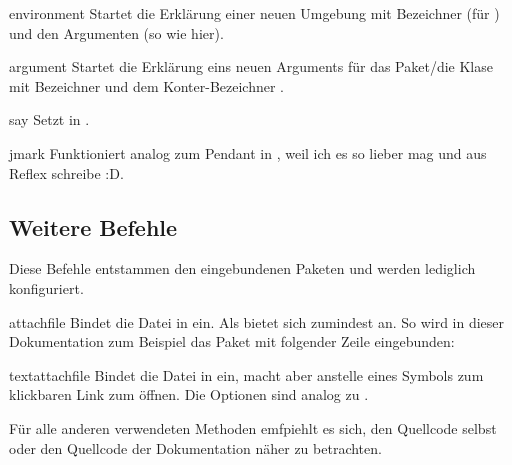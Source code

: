 \documentclass{sopra-base}
\begin{document}
\begin{environment}{environment}{}
    Startet die Erklärung einer neuen Umgebung mit Bezeichner  (für ) und den Argumenten  (so wie hier).
\end{environment}

\begin{environment}{argument}{}
    Startet die Erklärung eins neuen Arguments für das Paket/die Klase mit Bezeichner  und dem Konter-Bezeichner .
\end{environment}

\begin{command}{say}{}
    Setzt  in .
\end{command}

\begin{command}{jmark}{}
    Funktioniert analog zum Pendant in , weil ich es so lieber mag und aus Reflex schreibe :D.
\end{command}

\subsection{Weitere Befehle}

Diese Befehle entstammen den eingebundenen Paketen und werden lediglich konfiguriert.

\begin{command}{attachfile}{}
    Bindet die Datei in  ein. Als  bietet sich zumindest  an. So wird in dieser Dokumentation zum Beispiel das Paket mit folgender Zeile eingebunden:
\begin{plainlatex}
\end{plainlatex}
\end{command}

\begin{command}{textattachfile}{}
    Bindet die Datei in  ein, macht aber anstelle eines Symbols  zum klickbaren Link zum öffnen. Die Optionen sind analog zu .
\end{command}

Für alle anderen verwendeten Methoden emfpiehlt es sich, den Quellcode selbst oder den Quellcode der Dokumentation näher zu betrachten.
\end{document}
